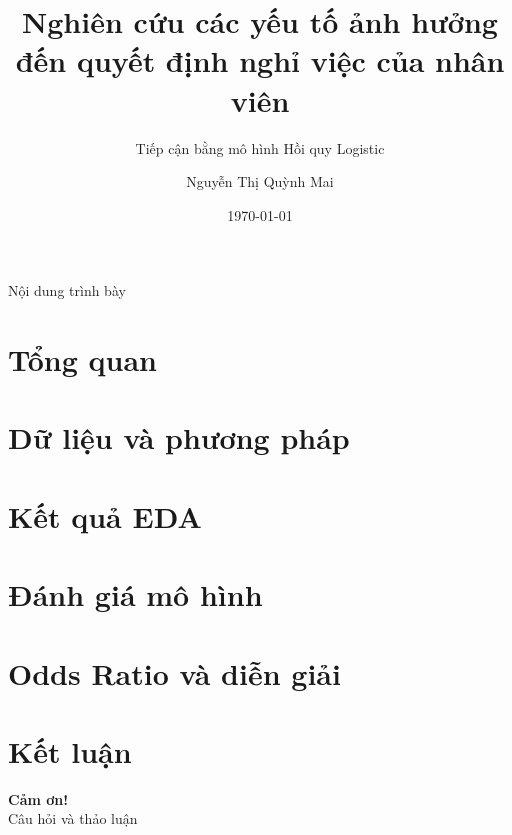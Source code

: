 \documentclass[aspectratio=169,12pt]{beamer}
\title[Nghiên cứu Nghỉ việc NV]{Nghiên cứu các yếu tố ảnh hưởng đến quyết định nghỉ việc của nhân viên}
\subtitle{Tiếp cận bằng mô hình Hồi quy Logistic}
\author[N.T.Q. Mai]{Nguyễn Thị Quỳnh Mai}
\date{\today}
\begin{document}
\begin{frame}
  \titlepage
\end{frame}

\begin{frame}{Nội dung trình bày}
  \tableofcontents
\end{frame}

\section{Tổng quan}


\section{Dữ liệu và phương pháp}


\section{Kết quả EDA}


\section{Đánh giá mô hình}


\section{Odds Ratio và diễn giải}


\section{Kết luận}


\begin{frame}
  \centering
  \vspace{2cm}
  {\Large \textbf{Cảm ơn!}}\\[0.5cm]
  {\large Câu hỏi và thảo luận}
  \vfill
\end{frame}
\end{document}
